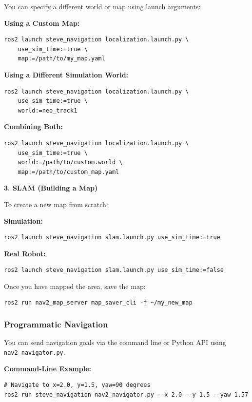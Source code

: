 \documentclass[12pt,oneside,a4paper]{article}
\begin{document}
You can specify a different world or map using launch arguments:

\textbf{Using a Custom Map:}
\begin{lstlisting}[style=bashstyle]
ros2 launch steve_navigation localization.launch.py \
    use_sim_time:=true \
    map:=/path/to/my_map.yaml
\end{lstlisting}

\textbf{Using a Different Simulation World:}
\begin{lstlisting}[style=bashstyle]
ros2 launch steve_navigation localization.launch.py \
    use_sim_time:=true \
    world:=neo_track1
\end{lstlisting}

\textbf{Combining Both:}
\begin{lstlisting}[style=bashstyle]
ros2 launch steve_navigation localization.launch.py \
    use_sim_time:=true \
    world:=/path/to/custom.world \
    map:=/path/to/custom_map.yaml
\end{lstlisting}

\textbf{3. SLAM (Building a Map)}

To create a new map from scratch:

\textbf{Simulation:}
\begin{lstlisting}[style=bashstyle]
ros2 launch steve_navigation slam.launch.py use_sim_time:=true
\end{lstlisting}

\textbf{Real Robot:}
\begin{lstlisting}[style=bashstyle]
ros2 launch steve_navigation slam.launch.py use_sim_time:=false
\end{lstlisting}

Once you have mapped the area, save the map:
\begin{lstlisting}[style=bashstyle]
ros2 run nav2_map_server map_saver_cli -f ~/my_new_map
\end{lstlisting}

\subsubsection{Programmatic Navigation}

You can send navigation goals via the command line or Python API using \texttt{nav2\_navigator.py}.

\textbf{Command-Line Example:}
\begin{lstlisting}[style=bashstyle]
# Navigate to x=2.0, y=1.5, yaw=90 degrees
ros2 run steve_navigation nav2_navigator.py --x 2.0 --y 1.5 --yaw 1.57
\end{lstlisting}
\end{document}
